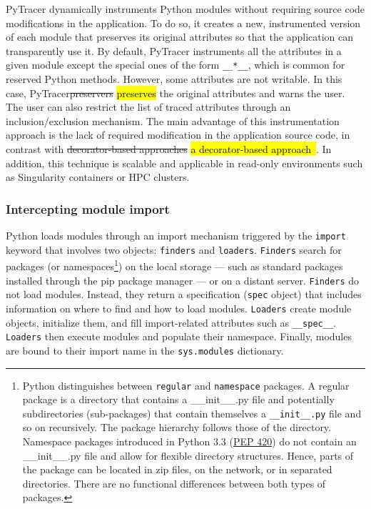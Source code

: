 \documentclass[10pt,journal,compsoc]{IEEEtran}
\newcommand{\pytracer}[0]{PyTracer\xspace}
\DeclareRobustCommand{\add}[1]{\sethlcolor{lightgreen}\hl{#1}}
\DeclareRobustCommand{\remove}[1]{\textcolor{lightred}{\sout{#1}}}
\DeclareRobustCommand{\add}[1]{#1}
\DeclareRobustCommand{\remove}[1]{}
\begin{document}
\pytracer dynamically instruments Python modules without requiring source code
modifications in the application. To do so, it creates a new, instrumented
version of each module that preserves its original attributes so that the
application can transparently use it.
By default, \pytracer instruments all the attributes in a given module except
the special ones of the form \texttt{\_\_*\_\_}, which is common for reserved
Python methods. However, some attributes are not writable. In this case,
\pytracer \remove{preservers} \add{preserves} the original attributes and warns
the user. The user can also restrict the list of traced attributes through an
inclusion/exclusion mechanism. The main advantage of this instrumentation
approach is the lack of required modification in the application source code, in
contrast with \remove{decorator-based approaches} \add{a decorator-based
    approach~\mbox{\cite{hunt2019decorators}}}. In addition, this technique is
scalable and applicable in read-only environments such as Singularity containers
or HPC clusters.





\subsubsection{Intercepting module import}

Python loads modules through an import mechanism triggered by the
\texttt{import} keyword that involves two objects: \texttt{finders} and
\texttt{loaders}. \texttt{Finders} search for packages (or
namespaces\footnote{Python distinguishes between \texttt{regular} and
    \texttt{namespace} packages. A regular package is a directory that contains a
    \_\_init\_\_.py file and potentially subdirectories (sub-packages) that contain
    themselves a \texttt{\_\_init\_\_.py} file and so on recursively. The package
    hierarchy follows those of the directory. Namespace packages introduced in
    Python 3.3 (\href{https://www.python.org/dev/peps/pep-0420/}{PEP 420}) do not
    contain an \_\_init\_\_.py file and allow for flexible directory structures.
    Hence, parts of the package can be located in zip files, on the network, or in
    separated directories. There are no functional differences between both types of
    packages.}) on the local storage --- such as standard packages installed through
the pip package manager --- or on a distant server. \texttt{Finders} do not load
modules. Instead, they return a specification (\texttt{spec} object) that
includes information on where to find and how to load modules. \texttt{Loaders}
create module objects, initialize them, and fill import-related attributes such
as \texttt{\_\_spec\_\_}. \texttt{Loaders} then execute modules and populate
their namespace. Finally, modules are bound to their import name in the
\texttt{sys.modules} dictionary.
\end{document}
